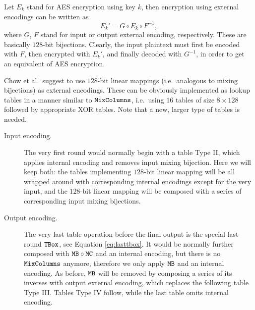 	Let $E_k$ stand for AES encryption using key $k$, then encryption using external encodings can be written as
	\begin{equation}
	\label{eq:extenc}
		E_k' = G \circ E_k \circ F^{-1} ,
	\end{equation}
	where $G$, $F$ stand for input or output external encoding, respectively. These are basically $128$-bit bijections. Clearly, the input plaintext must first be encoded with $F$, then encrypted with $E_k'$, and finally decoded with $G^{-1}$, in order to get an equivalent of AES encryption.
	
	Chow et al.\ suggest to use $128$-bit linear mappings (i.e.\ analogous to mixing bijections) as external encodings. These can be obviously implemented as lookup tables in a manner similar to $\texttt{MixColumns}$, i.e.\ using $16$ tables of size $8\times 128$ followed by appropriate XOR tables. Note that a new, larger type of tables is needed.
	
	\begin{description}
		\item[Input encoding.] The very first round would normally begin with a table Type II, which applies internal encoding and removes input mixing bijection. Here we will keep both: the tables implementing $128$-bit linear mapping will be all wrapped around with corresponding internal encodings except for the very input, and the $128$-bit linear mapping will be composed with a series of corresponding input mixing bijections.
		\item[Output encoding.] The very last table operation before the final output is the special last-round $\texttt{TBox}$, see Equation \ref{eq:lasttbox}. It would be normally further composed with $\texttt{MB}\circ\texttt{MC}$ and an internal encoding, but there is no $\texttt{MixColumns}$ anymore, therefore we only apply $\texttt{MB}$ and an internal encoding. As before, $\texttt{MB}$ will be removed by composing a series of its inverses with output external encoding, which replaces the following table Type III. Tables Type IV follow, while the last table omits internal encoding.
	\end{description}
	



